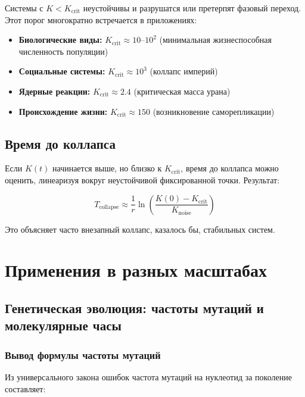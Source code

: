 \documentclass[12pt,a4paper]{article}
\theoremstyle{remark}
\newcommand{\Keffcrit}{K_{\mathrm{crit}}}
\begin{document}
	Системы с $K < \Keffcrit$ неустойчивы и разрушатся или претерпят фазовый переход. Этот порог многократно встречается в приложениях:
	
	\begin{itemize}
		\item \textbf{Биологические виды:} $\Keffcrit \approx 10$--$10^2$ (минимальная жизнеспособная численность популяции)
		\item \textbf{Социальные системы:} $\Keffcrit \approx 10^3$ (коллапс империй)
		\item \textbf{Ядерные реакции:} $\Keffcrit \approx 2.4$ (критическая масса урана)
		\item \textbf{Происхождение жизни:} $\Keffcrit \approx 150$ (возникновение саморепликации)
	\end{itemize}
	
	\subsection{Время до коллапса}
	
	Если $K(t)$ начинается выше, но близко к $\Keffcrit$, время до коллапса можно оценить, линеаризуя вокруг неустойчивой фиксированной точки. Результат:
	
	\begin{equation}
		T_{\text{collapse}} \approx \frac{1}{r} \ln\left( \frac{K(0) - \Keffcrit}{K_{\text{noise}}} \right)
		\label{eq:collapse-time}
	\end{equation}
	
	Это объясняет часто внезапный коллапс, казалось бы, стабильных систем.
	
	\section{Применения в разных масштабах}
	\label{sec:applications}
	
	\subsection{Генетическая эволюция: частоты мутаций и молекулярные часы}
	\label{subsec:genetic}
	
	\subsubsection{Вывод формулы частоты мутаций}
	
	Из универсального закона ошибок частота мутаций на нуклеотид за поколение составляет:
	
\end{document}
